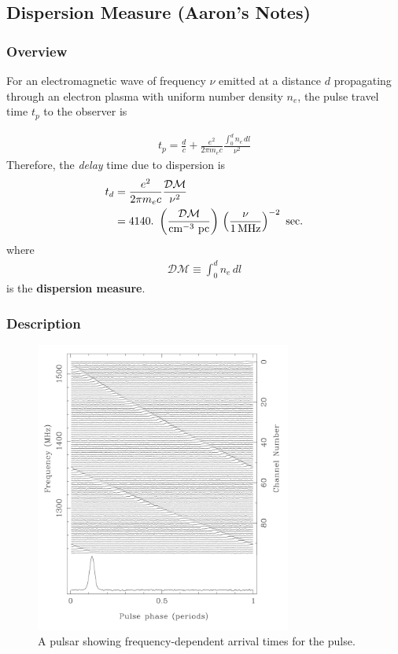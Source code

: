 \documentclass{article}
\begin{document}
\subsection{Dispersion Measure (Aaron's Notes)}

\subsubsection{Overview}

For an electromagnetic wave of frequency $\nu$ emitted at a distance $d$ propagating through an electron plasma with uniform number density $n_e$, the pulse travel time $t_p$ to the observer is

\begin{align}
t_p = \frac{d}{c}+\frac{e^2}{2\pi m_ec}\frac{\int_0^d n_e\,dl}{\nu^2}
\end{align}
Therefore, the \textit{delay} time due to dispersion is
\begin{align}
t_d &= \frac{e^2}{2\pi m_ec}\frac{\mathcal{DM}}{\nu^2}\\
&= 4140.\,\,\left(\frac{\mathcal{DM}}{{\rm cm}^{-3}\,\,{\rm pc}}\right)\,\left(\frac{\nu}{1\,{\rm MHz}}\right)^{-2}\,\,{\rm sec.}
\end{align}
where
\begin{align}
\boxed{\mathcal{DM}\equiv \int_0^d n_e\,dl}
\end{align}
is the \textbf{dispersion measure}.

\subsubsection{Description}

\begin{figure}
    \centering
    \includegraphics[width=0.75\textwidth]{figures/Pulsar_dm.png}
    \caption{A pulsar showing frequency-dependent arrival times for the pulse.}
    \label{fig:dispmeasure}
\end{figure}
\end{document}
